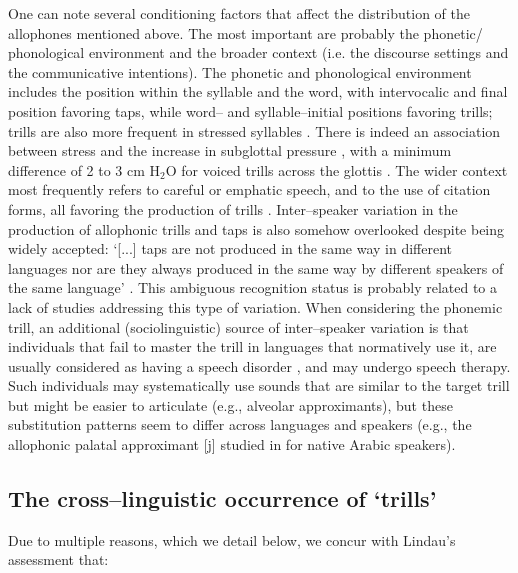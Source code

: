 One can note several conditioning factors that affect the distribution of the allophones mentioned above. The most important are probably the phonetic/ phonological environment and the broader context (i.e. the discourse settings and the communicative intentions). The phonetic and phonological environment includes the position within the syllable and the word, with intervocalic and final position favoring taps, while word– and syllable–initial positions favoring trills; trills are also more frequent in stressed syllables \parencite{eadesGayo2006,iskarousInteractionContrastProsody2010,mooneyBearnaisGascon2014}. There is indeed an association between stress and the increase in subglottal pressure \parencite{liebermanIntonationPerceptionLanguage1966}, with a minimum difference of 2 to 3 cm H$_2$O for voiced trills across the glottis \parencite{soleAerodynamicCharacteristicsTrills2002}. The wider context most frequently refers to careful or emphatic speech, and to the use of citation forms, all favoring the production of trills \parencite{breenCentralArrernte2005,bakerDariAfghanPersian2016}. Inter–speaker variation in the production of allophonic trills and taps is also somehow overlooked despite being widely accepted: ‘[...] taps are not produced in the same way in different languages nor are they always produced in the same way by different speakers of the same language’ \parencite[161]{lindauStory1985}. This ambiguous recognition status is probably related to a lack of studies addressing this type of variation. When considering the phonemic trill, an additional (sociolinguistic) source of inter–speaker variation is that individuals that fail to master the trill in languages that normatively use it, are usually considered as having a speech disorder \parencite{romano2013preliminary}, and may undergo speech therapy. Such individuals may systematically use sounds that are similar to the target trill but might be easier to articulate (e.g., alveolar approximants), but these substitution patterns seem to differ across languages and speakers (e.g., the allophonic palatal approximant [j] studied in \textcite{alfwaressRelationshipVocalTract2015} for native Arabic speakers).

\subsection{The cross–linguistic occurrence of ‘trills’}

Due to multiple reasons, which we detail below, we concur with Lindau’s \parencite*{lindauStory1985} assessment that:

